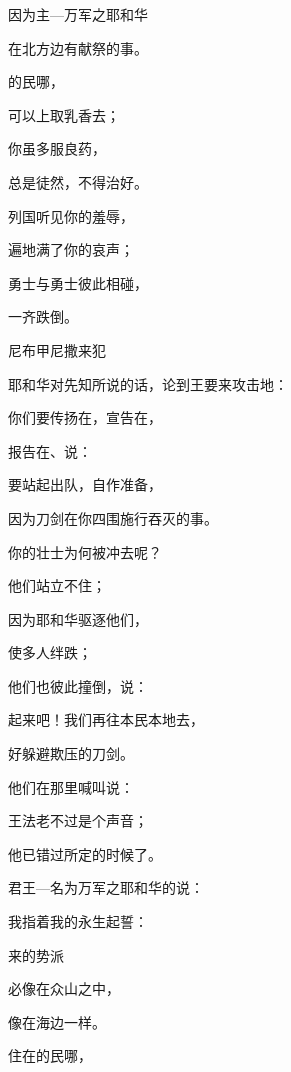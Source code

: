 {\par }{\Q 因为主—万军之耶和华
\par }{\Q 在北方{}边有献祭的事。
\par }{\Q {}的民哪，
\par }{\Q 可以上{}取乳香去；
\par }{\Q 你虽多服良药，
\par }{\Q 总是徒然，不得治好。
\par }{\Q {}列国听见你的羞辱，
\par }{\Q 遍地满了你的哀声；
\par }{\Q 勇士与勇士彼此相碰，
\par }{\Q 一齐跌倒。
\par }{\SH 尼布甲尼撒来犯
\par }{\PP {}耶和华对先知{}所说的话，论到{}王{}要来攻击{}地：
\par }{\Q {}你们要传扬在{}，宣告在{}，
\par }{\Q 报告在{}、{}说：
\par }{\Q 要站起出队，自作准备，
\par }{\Q 因为刀剑在你四围施行吞灭的事。
\par }{\Q {}你的壮士为何被冲去呢？
\par }{\Q 他们站立不住；
\par }{\Q 因为耶和华驱逐他们，
\par }{\Q {}使多人绊跌；
\par }{\Q 他们也彼此撞倒，说：
\par }{\Q 起来吧！我们再往本民本地去，
\par }{\Q 好躲避欺压的刀剑。
\par }{\Q {}他们在那里喊叫说：
\par }{王法老不过是个声音；
\par }{\Q 他已错过所定的时候了。
\par }{\BB \par }{\Q {}君王—名为万军之耶和华的说：
\par }{\Q 我指着我的永生起誓：
\par }{来的势派
\par }{\Q 必像{}在众山之中，
\par }{\Q 像{}在海边一样。
\par }{\Q {}住在{}的民哪，
}
